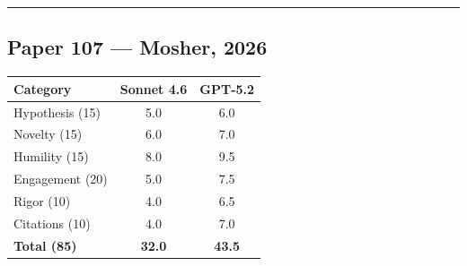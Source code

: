 \documentclass[11pt]{article}
\begin{document}
\bigskip
\hrule
\bigskip

\subsection*{Paper 107 --- Mosher, 2026}

\medskip

\begin{tabular}{lcc}
\toprule
\textbf{Category} & \textbf{Sonnet 4.6} & \textbf{GPT-5.2} \\
\midrule
Hypothesis (15) & 5.0 & 6.0 \\
Novelty (15) & 6.0 & 7.0 \\
Humility (15) & 8.0 & 9.5 \\
Engagement (20) & 5.0 & 7.5 \\
Rigor (10) & 4.0 & 6.5 \\
Citations (10) & 4.0 & 7.0 \\
\midrule
\textbf{Total (85)} & \textbf{32.0} & \textbf{43.5} \\
\bottomrule
\end{tabular}

\bigskip
\end{document}
